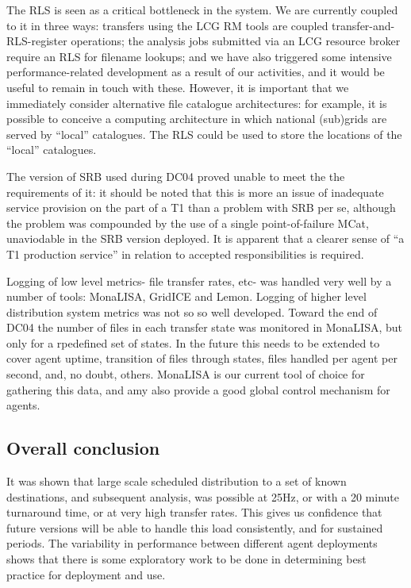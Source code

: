 \documentclass{cmspaper}
\begin{document}
The RLS is seen as a critical bottleneck in the system. We are
currently coupled to it in three ways: transfers using the LCG RM
tools are coupled transfer-and-RLS-register operations; the analysis
jobs submitted via an LCG resource broker require an RLS for filename
lookups; and we have also triggered some intensive performance-related
development as a result of our activities, and it would be useful to
remain in touch with these. However, it is important that we
immediately consider alternative file catalogue architectures: for
example, it is possible to conceive a computing architecture in which
national (sub)grids are served by ``local'' catalogues. The RLS could
be used to store the locations of the ``local'' catalogues.

The version of SRB used during DC04 proved unable to meet the the
requirements of it: it should be noted that this is more an issue of
inadequate service provision on the part of a T1 than a problem with
SRB per se, although the problem was compounded by the use of a single
point-of-failure MCat, unaviodable in the SRB version deployed. It is
apparent that a clearer sense of ``a T1 production service'' in
relation to accepted responsibilities is required.

Logging of low level metrics- file transfer rates, etc- was handled
very well by a number of tools: MonaLISA, GridICE and Lemon. Logging
of higher level distribution system metrics was not so so well
developed. Toward the end of DC04 the number of files in each transfer
state was monitored in MonaLISA, but only for a rpedefined set of
states. In the future this needs to be extended to cover agent uptime,
transition of files through states, files handled per agent per
second, and, no doubt, others. MonaLISA is our current tool of choice
for gathering this data, and amy also provide a good global control
mechanism for agents.

\subsection{Overall conclusion}
It was shown that large scale scheduled distribution to a set of known
destinations, and subsequent analysis, was possible at 25Hz, or with a
20 minute turnaround time, or at very high transfer rates. This gives
us confidence that future versions will be able to handle this load
consistently, and for sustained periods. The variability in
performance between different agent deployments shows that there is
some exploratory work to be done in determining best practice for
deployment and use.
\end{document}
